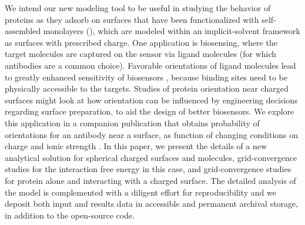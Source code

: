 We intend our new modeling tool to be useful in studying the behavior of proteins as they adsorb on surfaces that have been functionalized with  self-assembled monolayers (\sam), which are modeled within an implicit-solvent framework as surfaces with prescribed charge. 
One application is biosensing, where the target molecules are captured on the sensor via ligand molecules (for which antibodies are a common choice). Favorable orientations of ligand molecules lead to greatly enhanced sensitivity of biosensors \cite{TajimaTakaiIshihara2011,TrillingBeekwilderZuilhof2013}, because binding sites need to be physically accessible to the targets. Studies of protein orientation near charged surfaces might look at how orientation can be influenced by engineering decisions regarding surface preparation, to aid the design of better biosensors. We explore this application in a companion publication that obtains probability of orientations for an antibody near a surface, as function of changing conditions on charge and ionic strength \cite{CooperBarba2015b}. 
In this paper, we present the details of a new analytical solution for spherical charged surfaces and molecules, grid-convergence studies for the interaction free energy in this case, and grid-convergence studies for protein \gb alone and interacting with a charged surface. The detailed analysis of the model is complemented with a diligent effort for reproducibility and we deposit both input and results data in accessible and permanent archival storage, in addition to the open-source code.
